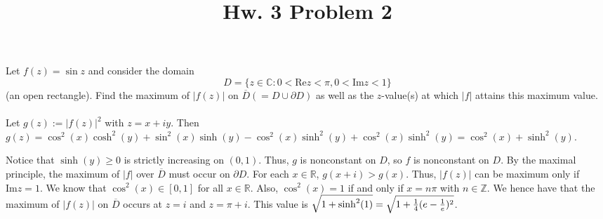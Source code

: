\documentclass[12pt]{article}
\newcommand{\C}{\mathbb{C}}
\newcommand{\R}{\mathbb{R}}
\newcommand{\Z}{\mathbb{Z}}
\renewcommand{\Im}{\text{Im}}
\renewcommand{\Re}{\text{Re}}
\newcommand{\ol}{\overline}
\begin{document}
\title{Hw. 3 Problem 2}
\maketitle

Let $f(z)=\sin⁡ z$ and consider the domain 
$$D=\{z\in \C :0<\Re  z<\pi,0<\Im z<1\}$$ (an open rectangle). Find the maximum of $|f(z)|$ on $\ol{D}(=D\cup \partial D)$ as well as the $z$-value(s) at which $|f|$ attains this maximum value.\\\\

Let $g(z):=|f(z)|^2$ with $z=x+iy$. Then $g(z)= \cos^2(x)\cosh^2(y)+\sin^2(x)\sinh(y)-\cos^2(x)\sinh^2(y)+\cos^2(x)\sinh^2(y)= \cos^2(x)+\sinh^2(y)$.

Notice that $\sinh(y)\ge0$ is strictly increasing on $(0,1)$. Thus, $g$ is nonconstant on $D$, so $f$ is nonconstant on $D$. By the maximal principle, the maximum of $|f|$ over $\ol{D}$ must occur on 
$\partial{D}$. For each $x\in\R$, $g(x+i)>g(x)$. Thus, $|f(z)|$ can be maximum only if $\Im z = 1$. We know that $\cos^2(x)\in [0,1]$ for all $x\in\R$. Also, $\cos^2(x)=1$ if and only if $x=n\pi$ with $n\in\Z$. We hence have that the maximum of $|f(z)|$ on $\ol{D}$ occurs at $z=i$ and $z=\pi+i$. This value is $\sqrt{1+\sinh^2(1)}=\sqrt{1+{1\over 4}(e-{1\over e})^2}$.
\end{document}
